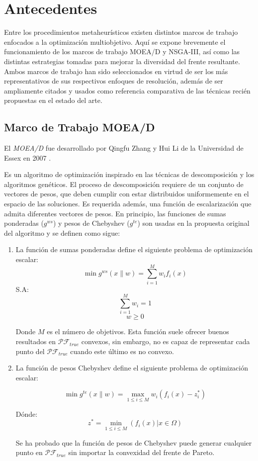 \documentclass[letterpaper,10pt]{article}
\begin{document}
\section{Antecedentes}

Entre los procedimientos metaheurísticos existen distintos marcos de trabajo enfocados a la optimización multiobjetivo.
Aquí se expone brevemente el funcionamiento de los marcos de trabajo MOEA/D y NSGA-III, así como las distintas estrategias tomadas para mejorar la diversidad del frente resultante.
Ambos marcos de trabajo han sido seleccionados en virtud de ser los más representativos de sus respectivos enfoques de resolución, además de ser ampliamente citados y usados como 
referencia comparativa de las técnicas recién propuestas en el estado del arte.

\subsection{Marco de Trabajo MOEA/D}
El \emph{MOEA/D} fue desarrollado por Qingfu Zhang y Hui Li de la Universidad de Essex en 2007 \cite{4358754}.

Es un algoritmo de optimización inspirado en las técnicas de descomposición y los algoritmos genéticos. El proceso de descomposición requiere de un conjunto de vectores de pesos,
que deben cumplir con estar distribuidos uniformemente en el espacio de las soluciones. Es requerida además, una función de escalarización que admita diferentes vectores de pesos. En principio,
las funciones de sumas ponderadas  ($g^{ws}$) y pesos de Chebyshev ($g^{te}$) son usadas en la propuesta original del algoritmo y se definen como sigue:

\begin{enumerate}
\item La función de sumas ponderadas define el siguiente problema de optimización escalar:
$$\min g^{ws}(x\|w) = \sum^M_{i=1} w_if_i(x) $$
S.A:
$$ \sum^M_{i=1} w_i = 1$$
$$w \geq 0$$

Donde $M$ es el número de objetivos. Esta función suele ofrecer buenos resultados en $\mathcal{PF}_{true}$ convexos, sin embargo, no es capaz de representar cada punto del $\mathcal{PF}_{true}$ cuando este último es no convexo.

\item La función de pesos Chebyshev define el siguiente problema de optimización escalar:

$$\min g^{te}(x\|w) = \max_{1\leq i \leq M} w_i(f_i(x) -z_i^{*})$$

Dónde:
$$z^{*}= \min_{1\leq i \leq M} (f_i(x) | x \in \Omega) $$

Se ha probado que la función de pesos de Chebyshev puede generar cualquier punto en $\mathcal{PF}_{true}$ sin importar la convexidad del frente de Pareto.
\end{enumerate}
\end{document}
